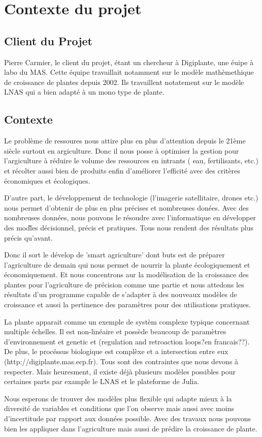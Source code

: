 \section{Contexte du projet}

\subsection{Client du Projet}

Pierre Carmier, le client du projet, \'etant un chercheur à Digiplante, une \'euipe à labo du MAS. Cette \'equipe travaillait notamment sur le mod\`ele math\`emethique de croissance de plantes depuis 2002. Ils travaillent notatement sur le mod\`ele LNAS qui a bien adapt\'e \`a un mono type de plante.
\subsection{Contexte}

Le probl\`eme de ressoures nous attire plus en plus d'attention depuis le 21\`eme si\`ecle surtout en argiculture. Donc il nous posse \`a optimiser la gestion pour l'argiculture \`a r\'eduire le volume des ressources en intrants ( eau, fertilisants, etc.) et r\'ecolter aussi bien de produits enfin d'am\'eliorer l'efficit\'e avec des crit\`eres \'economiques et \'ecologiques.

D'autre part, le d\'eveloppement de technologie (l'imagerie satellitaire, drones etc.) nous permet d'obtenir de plus en plus pr\'ecises et nombreuses don\'ees. Avec des nombreuses donn\'ees, nous pouvons le r\'esoudre avec l'informatique en d\'evelopper des mod\`les d\'ecisionnel, pr\'ecis et pratiques. Tous nous rendent des r\'esultats plus pr\'ecis qu'avant.

Donc il sort le d\'evelop de 'smart agriculture' dont buts est de pr\'eparer l'agriculture de demain qui nous permet de nourrir la plante \'ecologiquement et  \'economiquement. Et nous concentrons aur la mod\'elisation de la croissance des plantes pour l'agriculture de pr\'ecision comme une partie et nous attedons les r\'esultats d'un programme capable de s'adapter \`a des nouveaux mod\`eles de croissance et aussi la pertinence des param\`etres pour des utilisations pratiques. 

La plante apparait comme un exemple de syst\`em complexe typique concernant multiple \'echelles. Il est non-lin\'eaire et poss\`ede beaucoup de param\`etres d'environnement et genetic et (regulation and retroaction loops?en francais??). De plus,  le proc\'essus biologique est compl\`exe et a intersection entre eux (http://digiplante.mas.ecp.fr). Tous sont des contraintes que nous devons \`a respecter. Mais heuresment, il existe d\'ej\`a plusieurs mod\`eles possibles pour certaines parts par example le LNAS et le plateforme de Julia.

Nous esperons de trouver des mod\`eles plus flexible qui adapte mieux \`a la diversit\'e de variables et conditions que l'on observe mais aussi avec moins d'incertitude par rapport aux donn\'ees possible. Avec des travaux nous pouvons bien les appliquer dans l'agriculture mais aussi de pr\'edire la croissance de plante.